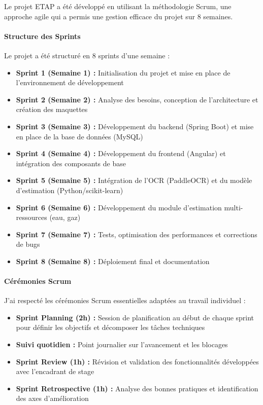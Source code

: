 \documentclass[12pt,a4paper]{article}
\begin{document}
Le projet ETAP a été développé en utilisant la méthodologie Scrum, une approche agile qui a permis une gestion efficace du projet sur 8 semaines.

\paragraph{Structure des Sprints}
Le projet a été structuré en 8 sprints d'une semaine :

\begin{itemize}
    \item \textbf{Sprint 1 (Semaine 1) :} Initialisation du projet et mise en place de l'environnement de développement
    \item \textbf{Sprint 2 (Semaine 2) :} Analyse des besoins, conception de l'architecture et création des maquettes
    \item \textbf{Sprint 3 (Semaine 3) :} Développement du backend (Spring Boot) et mise en place de la base de données (MySQL)
    \item \textbf{Sprint 4 (Semaine 4) :} Développement du frontend (Angular) et intégration des composants de base
    \item \textbf{Sprint 5 (Semaine 5) :} Intégration de l'OCR (PaddleOCR) et du modèle d'estimation (Python/scikit-learn)
    \item \textbf{Sprint 6 (Semaine 6) :} Développement du module d'estimation multi-ressources (eau, gaz)
    \item \textbf{Sprint 7 (Semaine 7) :} Tests, optimisation des performances et corrections de bugs
    \item \textbf{Sprint 8 (Semaine 8) :} Déploiement final et documentation
\end{itemize}

\paragraph{Cérémonies Scrum}
J'ai respecté les cérémonies Scrum essentielles adaptées au travail individuel :

\begin{itemize}
    \item \textbf{Sprint Planning (2h) :} Session de planification au début de chaque sprint pour définir les objectifs et décomposer les tâches techniques
    \item \textbf{Suivi quotidien :} Point journalier sur l'avancement et les blocages
    \item \textbf{Sprint Review (1h) :} Révision et validation des fonctionnalités développées avec l'encadrant de stage
    \item \textbf{Sprint Retrospective (1h) :} Analyse des bonnes pratiques et identification des axes d'amélioration
\end{itemize}
\end{document}
